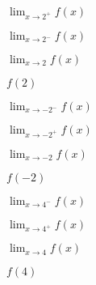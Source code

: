 \documentclass[11pt,letterpaper]{article}
\newenvironment{2enumerate}{%
	\begin{enumerate}[(a)]
	\begin{multicols}{2}
	}{%
	\end{multicols}
	\end{enumerate}
}
\newcommand{\ds}{\displaystyle}
\begin{document}
        \begin{2enumerate}
        \item $\ds\lim_{x \to 2^+} f(x)$ 
        \item $\ds\lim_{x \to 2^-} f(x)$ 
        \item $\ds\lim_{x \to 2} f(x)$ 
        \item $f(2)$ 
        \item $\ds\lim_{x \to -2^-} f(x)$ 
        \item $\ds\lim_{x \to -2^+} f(x)$ 
        \item $\ds\lim_{x \to -2} f(x)$ 
        \item $f(-2)$ 
        \item $\ds\lim_{x \to 4^-} f(x)$ 
        \item $\ds\lim_{x \to 4^+} f(x)$ 
        \item $\ds\lim_{x \to 4} f(x)$ 
        \item $f(4)$ 
        \end{2enumerate}
\end{document}
